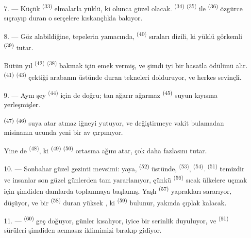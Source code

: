 7. --- Küçük  \textsuperscript{(33)} elmalarla yüklü, ki
olunca güzel  olacak. 
\textsuperscript{(34)}  \textsuperscript{(35)} ile
 \textsuperscript{(36)} özgürce sıçrayıp duran o serçelere
kıskançlıkla bakıyor.

8. --- Göz alabildiğine, tepelerin yamacında, 
\textsuperscript{(40)} sıraları dizili, ki  yüklü
görkemli  \textsuperscript{(39)} tutar.

Bütün yıl  \textsuperscript{(42)} 
\textsuperscript{(38)} bakmak için emek vermiş, ve şimdi iyi bir hasatla
ödülünü alır.  \textsuperscript{(41)}
 \textsuperscript{(43)} çektiği arabanın üstünde duran
tekneleri dolduruyor, ve herkes sevinçli.

\VUsaut{5.0mm}
\VUsaut{3.4mm}

9. --- Aynı şey  \textsuperscript{(44)} için de doğru; tan
ağarır ağarmaz  \textsuperscript{(45)} suyun kıyısına
yerleşmişler.

 \textsuperscript{(47)} 
\textsuperscript{(46)} suya atar atmaz iğneyi yutuyor, ve 
değiştirmeye vakit bulamadan misinanın ucunda yeni bir av çırpınıyor.

Yine de  \textsuperscript{(48)}, ki 
\textsuperscript{(49)}  \textsuperscript{(50)} ortasına ağını
atar, çok daha fazlasını tutar.

10. --- Sonbahar güzel gezinti mevsimi: yaya, 
\textsuperscript{(52)} üstünde,  \textsuperscript{(53)},
 \textsuperscript{(54)}. 
\textsuperscript{(51)} temizdir ve insanlar son güzel günlerden tam
yararlanıyor, çünkü  \textsuperscript{(56)} sıcak
ülkelere uçmak için şimdiden damlarda toplanmaya başlamış. Yaşlı
 \textsuperscript{(57)} yaprakları sararıyor,
 düşüyor, ve bir  \textsuperscript{(58)}
duran yüksek , ki 
\textsuperscript{(59)} bulunur, yakında çıplak kalacak.

11. ---  \textsuperscript{(60)} geç doğuyor, günler kısalıyor,
 iyice bir serinlik duyuluyor, ve 
\textsuperscript{(61)} sürüleri şimdiden acımasız iklimimizi bırakıp gidiyor.
\VUsaut{6.0mm}
\VUfilet{22mm}
